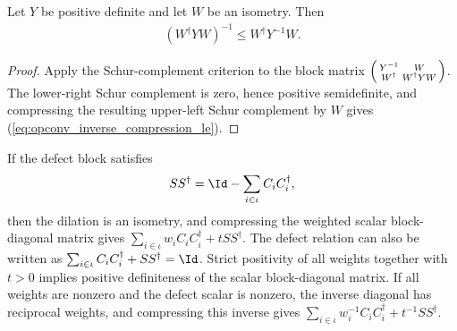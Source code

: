 \begin{lemma}\label{lem:operator_jensen_inverse_compression}
    \leanok
    Let $Y$ be positive definite and let $W$ be an isometry. Then
    \begin{align}
        (W^\dagger YW)^{-1}
        \le W^\dagger Y^{-1}W.
        \label{eq:opconv_inverse_compression_le}
    \end{align}
\end{lemma}

\begin{proof}
    \leanok
    Apply the Schur-complement criterion to the block matrix
    $\begin{psmallmatrix}Y^{-1}&W\\W^\dagger&W^\dagger YW\end{psmallmatrix}$.
    The lower-right Schur complement is zero, hence positive semidefinite, and
    compressing the resulting upper-left Schur complement by $W$ gives
    (\ref{eq:opconv_inverse_compression_le}).
\end{proof}

\begin{lemma}\label{lem:operator_jensen_povm_compression}
    \leanok
    If the defect block satisfies
    \begin{align}
        SS^\dagger
        =\Id-\sum_{i\in\iota}C_iC_i^\dagger,
        \label{eq:opconv_defect_block_relation}
    \end{align}
    then the dilation is an isometry, and compressing the weighted scalar
    block-diagonal matrix gives
    $\sum_{i\in\iota}w_iC_iC_i^\dagger+tSS^\dagger$.
    The defect relation can also be written as
    $\sum_{i\in\iota}C_iC_i^\dagger+SS^\dagger=\Id$.
    Strict positivity of all weights together with $t>0$ implies positive
    definiteness of the scalar block-diagonal matrix. If all weights are
    nonzero and the defect scalar is nonzero, the inverse diagonal has
    reciprocal weights, and compressing this inverse gives
    $\sum_{i\in\iota}w_i^{-1}C_iC_i^\dagger+t^{-1}SS^\dagger$.
\end{lemma}

